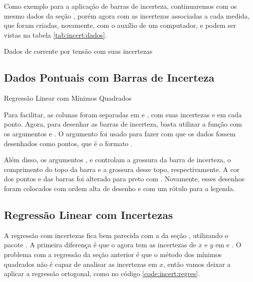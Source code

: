 Como exemplo para a aplicação de barras de incerteza, continuaremos com os mesmo dados da seção , porém agora com as incertezas associadas a cada medida, que foram criadas, novamente, com o auxílio de um computador, e podem ser vistas na tabela \ref{tab:incert:dados}.

\begin{table}[H]
    \centering
    
    \caption{Dados de corrente por tensão com suas incertezas}
    \label{tab:incert:dados}
\end{table}


\subsection{Dados Pontuais com Barras de Incerteza}

    \begin{listing}[H]
        \caption{Regressão Linear com Mínimos Quadrados}
        \label{code:incert:dados}

    \end{listing}

    Para facilitar, as colunas foram separadas em  e , com suas incertezas  e  em cada ponto. Agora, para desenhar as barras de incerteza, basta utilizar a função \href{https://matplotlib.org/3.1.0/api/_as_gen/matplotlib.pyplot.errorbar.html}{} com os argumentos  e . O argumento  foi usado para fazer com que os dados fossem desenhados como pontos, que é o formato .

    Além disso, os argumentos ,  e  controlam a grossura da barra de incerteza, o comprimento do topo da barra e a grossura desse topo, respectivamente. A cor dos pontos e das barras foi alterado para preto com . Novamente, esses desenhos foram colocados com ordem alta de desenho e com um rótulo para a legenda.


\subsection{Regressão Linear com Incertezas}

    A regressão com incertezas fica bem parecida com a da seção , utilizando o pacote . A primeira diferença é que o  agora tem as incertezas de $x$ e $y$ em  e . O problema com a regressão da seção anterior é que o método dos mínimos quadrados não é capaz de analisar as incertezas em $x$, então vamos deixar a  aplicar a regressão ortogonal, como no código \ref{code:incert:regres}.

